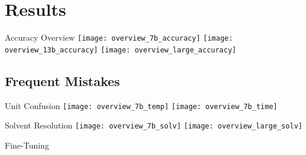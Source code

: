 \section{Results}

\begin{frame}{Accuracy Overview}
    \centering
    \texttt{[image: overview\_7b\_accuracy]}
    \texttt{[image: overview\_13b\_accuracy]}
    \texttt{[image: overview\_large\_accuracy]}
\end{frame}

\subsection{Frequent Mistakes}

\begin{frame}{Unit Confusion}
    \centering
    \texttt{[image: overview\_7b\_temp]}
    \texttt{[image: overview\_7b\_time]}
\end{frame}

\begin{frame}{Solvent Resolution}
    \centering
    \texttt{[image: overview\_7b\_solv]}
    \texttt{[image: overview\_large\_solv]}
\end{frame}

\begin{frame}[c]{Fine-Tuning}
\end{frame}
